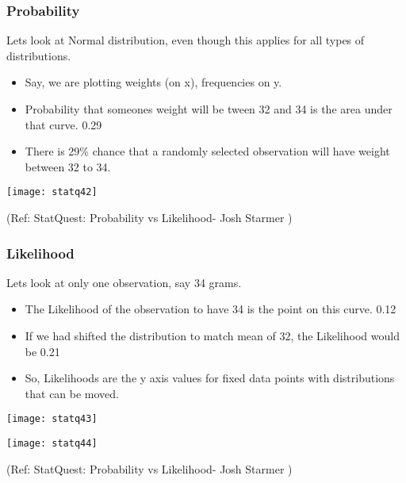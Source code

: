 \begin{frame}[fragile]\frametitle{Probability}
Lets look at Normal distribution, even though this applies for all types of distributions.


	\begin{itemize}
	\item Say, we are plotting weights (on x), frequencies on y.
	\item Probability that someones weight will be tween 32 and 34 is the area under that curve. 0.29
	\item There is 29\% chance that a randomly selected observation will have weight between 32 to 34.
	\end{itemize}

      \begin{center}
      \texttt{[image: statq42]}
	  
	  
	  	\end{center}
		
		
\tiny{(Ref: StatQuest: Probability vs Likelihood- Josh Starmer )}

\end{frame}

\begin{frame}[fragile]\frametitle{Likelihood}
Lets look at only one observation, say 34 grams.


	\begin{itemize}
	\item The Likelihood of the observation to have 34 is the point on this curve. 0.12
	\item If we had shifted the distribution to match mean of 32, the Likelihood would be 0.21
	\item So, Likelihoods are the y axis values for fixed data points with distributions that can be moved.
	\end{itemize}

      \begin{center}
      \texttt{[image: statq43]}
	  
	        \texttt{[image: statq44]}
	  
	  	\end{center}

		\tiny{(Ref: StatQuest: Probability vs Likelihood- Josh Starmer )}

\end{frame}

